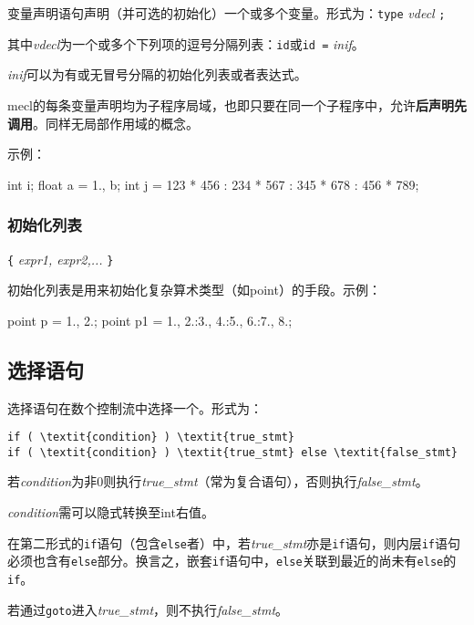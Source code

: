 \documentclass[UTF8]{ctexart}
\begin{document}
变量声明语句声明（并可选的初始化）一个或多个变量。形式为：\verb|type| \textit{vdecl} \verb|;|

其中\textit{vdecl}为一个或多个下列项的逗号分隔列表：\verb|id|或\verb|id =| \textit{inif}。

\textit{inif}可以为有或无冒号分隔的初始化列表或者表达式。

mecl的每条变量声明均为子程序局域，也即只要在同一个子程序中，允许\textbf{后声明先调用}。同样无局部作用域的概念。

示例：

\begin{MUAvbt}
int i;
float a = 1., b;
int j = 123 * 456 : 234 * 567 : 345 * 678 : 456 * 789;
\end{MUAvbt}

\subsubsection{初始化列表}

\verb|{| \textit{expr1, expr2,...} \verb|}|

初始化列表是用来初始化复杂算术类型（如point）的手段。示例：

\begin{MUAvbt}
point p = {1., 2.};
point p1 = {1., 2.}:{3., 4.}:{5., 6.}:{7., 8.};
\end{MUAvbt}

\subsection{选择语句}

选择语句在数个控制流中选择一个。形式为：

\begin{Verbatim}[frame=single, rulecolor=\color{magenta}, commandchars=\\\{\}]
if ( \textit{condition} ) \textit{true_stmt}
if ( \textit{condition} ) \textit{true_stmt} else \textit{false_stmt}
\end{Verbatim}

若\textit{condition}为非0则执行\textit{true\_stmt}（常为复合语句），否则执行\textit{false\_stmt}。

\textit{condition}需可以隐式转换至int右值。

在第二形式的\verb|if|语句（包含\verb|else|者）中，若\textit{true\_stmt}亦是\verb|if|语句，则内层\verb|if|语句必须也含有\verb|else|部分。换言之，嵌套\verb|if|语句中，\verb|else|关联到最近的尚未有\verb|else|的\verb|if|。

若通过\verb|goto|进入\textit{true\_stmt}，则不执行\textit{false\_stmt}。
\end{document}
